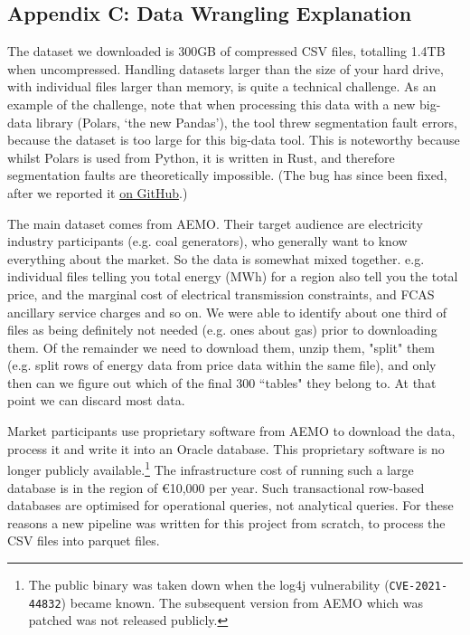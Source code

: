 \subsection*{Appendix C: Data Wrangling Explanation}

The dataset we downloaded is 300GB of compressed CSV files, totalling 1.4TB when uncompressed. Handling datasets larger than the size of your hard drive, with individual files larger than memory, is quite a technical challenge. As an example of the challenge, note that when processing this data with a new big-data library (Polars, `the new Pandas'), the tool threw segmentation fault errors, because the dataset is too large for this big-data tool. This is noteworthy because whilst Polars is used from Python, it is written in Rust, and therefore segmentation faults are theoretically impossible. (The bug has since been fixed, after we reported it \href{https://github.com/pola-rs/polars/issues/13915}{on GitHub}.)

The main dataset comes from AEMO. Their target audience are electricity industry participants (e.g. coal generators), who generally want to know everything about the market. So the data is somewhat mixed together. e.g. individual files telling you total energy (MWh) for a region also tell you the total price, and the marginal cost of electrical transmission constraints, and FCAS ancillary service charges and so on. We were able to identify about one third of files as being definitely not needed (e.g. ones about gas) prior to downloading them. Of the remainder we need to download them, unzip them, "split" them (e.g. split rows of energy data from price data within the same file), and only then can we figure out which of the final 300 ``tables" they belong to. At that point we can discard most data. 

Market participants use proprietary software from \ac{AEMO} to download the data, process it and write it into an Oracle database. This proprietary software is no longer publicly available.\footnote{The public binary was taken down when the log4j vulnerability (\texttt{CVE-2021-44832}) became known. The subsequent version from AEMO which was patched was not released publicly.} The infrastructure cost of running such a large database is in the region of €10,000 per year. Such transactional row-based databases are optimised for operational queries, not analytical queries. For these reasons a new pipeline was written for this project from scratch, to process the CSV files into parquet files.

